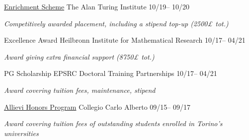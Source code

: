 
\begin{cvhonors}

	\cvhonor
	{\href{https://www.turing.ac.uk/work-turing/studentships/enrichment}{Enrichment Scheme}}
	{The Alan Turing Institute}
	{}%
	{10\slash 19-- 10\slash 20}
	
	\extracvhonor
	{}
	{\emph{Competitively awarded placement, including a stipend top-up (2500£ tot.)}}
	{}
	{}
	
	\cvhonor
	{Excellence Award}
	{Heilbronn Institute for Mathematical Research}
	{}%
	{10\slash 17-- 04\slash 21}
	
	\extracvhonor
	{}
	{\emph{Award giving extra financial support (8750£ tot.)}}
	{}
	{}
	
	\cvhonor
	{PG Scholarship}
	{EPSRC Doctoral Training Partnerships}
	{}
	{10\slash 17-- 04\slash 21}
	
	\extracvhonor
	{}
	{\emph{Award covering tuition fees, maintenance, stipend}}
	{}
	{}
	
	
	\cvhonor
	{\href{https://www.carloalberto.org/education/allievi-honors-program/}{Allievi Honors Program}}
	{Collegio Carlo Alberto}
	{}
	{09\slash 15-- 09\slash 17}
	
	\extracvhonor
	{}
	{\emph{Award covering tuition fees of outstanding students enrolled in Torino's universities}}
	{}
	{}
	
\end{cvhonors}